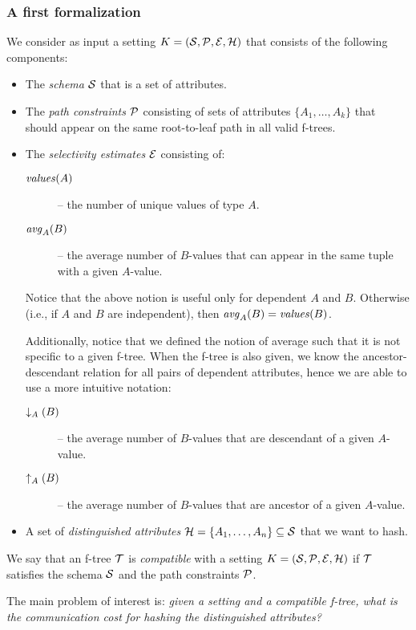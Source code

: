 \subsubsection{A first formalization}\label{sec:formalization}
We consider as input a setting $K=(\S, \P, \E, \H)$ that consists of the following components:
\begin{itemize}
\item The {\em schema} $\S$ that is a set of attributes.
\item The {\em path constraints} $\P$ consisting of sets of attributes $\{A_1,\ldots,A_k\}$ that should appear on the same root-to-leaf path in all valid f-trees.
\item The {\em selectivity estimates} $\E$ consisting of:

\begin{description}
\item[$\vals(A)$] -- the number of unique values of type $A$.
\item[$\avg_A(B)$] -- the average number of $B$-values that can appear in the same tuple with a given $A$-value.
\end{description}
Notice that the above notion is useful only for dependent $A$ and $B$.
Otherwise (i.e., if $A$ and $B$ are independent), then $\avg_A(B) = \vals(B)$.

Additionally, notice that we defined the notion of average such that it is not specific to a given f-tree.
When the f-tree is also given, we know the ancestor-descendant relation for all pairs of dependent attributes, hence we are able to use a more intuitive notation:

\begin{description}
\item[$\avgd_A(B)$] -- the average number of $B$-values that are descendant of a given $A$-value.
\item[$\avgu_A(B)$] -- the average number of $B$-values that are ancestor of a given $A$-value.
\end{description}

\item A set of {\em distinguished attributes} $\H=\{A_1,\ldots,A_n\}\subseteq\S$ that we want to hash.

\end{itemize}
We say that an f-tree $\T$ is {\em compatible} with a setting $K=(\S,\P,\E,\H)$ if $\T$ satisfies the schema $\S$ and the path constraints $\P$.

The main problem of interest is: {\em given a setting and a compatible f-tree, what is the communication cost for hashing the distinguished attributes?}

